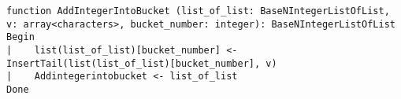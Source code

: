 \begin{lstlisting}[breaklines]
function AddIntegerIntoBucket (list_of_list: BaseNIntegerListOfList, v: array<characters>, bucket_number: integer): BaseNIntegerListOfList
Begin
|    list(list_of_list)[bucket_number] <- InsertTail(list(list_of_list)[bucket_number], v)
|    Addintegerintobucket <- list_of_list
Done
\end{lstlisting}
